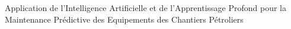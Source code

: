 \vspace*{\fill}
\begin{center}
{\Huge Application de l'Intelligence Artificielle et de l'Apprentissage Profond pour la Maintenance Prédictive des Equipements des Chantiers Pétroliers}
\end{center}
\vspace*{\fill}
